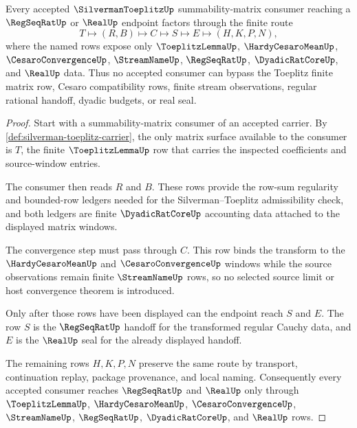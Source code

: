 \begin{theorem}\label{thm:silverman-toeplitz-regular-cauchy-handoff}
Every accepted $\SilvermanToeplitzUp$ summability-matrix consumer reaching a $\RegSeqRatUp$ or $\RealUp$ endpoint factors through the finite route
$$
T\longmapsto (R,B)\longmapsto C\longmapsto S\longmapsto E\longmapsto (H,K,P,N),
$$
where the named rows expose only $\ToeplitzLemmaUp$, $\HardyCesaroMeanUp$, $\CesaroConvergenceUp$, $\StreamNameUp$, $\RegSeqRatUp$, $\DyadicRatCoreUp$, and $\RealUp$ data. Thus no accepted consumer can bypass the Toeplitz finite matrix row, Cesaro compatibility rows, finite stream observations, regular rational handoff, dyadic budgets, or real seal.
\end{theorem}
\begin{proof}
Start with a summability-matrix consumer of an accepted carrier. By \autoref{def:silverman-toeplitz-carrier}, the only matrix surface available to the consumer is $T$, the finite $\ToeplitzLemmaUp$ row that carries the inspected coefficients and source-window entries.

The consumer then reads $R$ and $B$. These rows provide the row-sum regularity and bounded-row ledgers needed for the Silverman--Toeplitz admissibility check, and both ledgers are finite $\DyadicRatCoreUp$ accounting data attached to the displayed matrix windows.

The convergence step must pass through $C$. This row binds the transform to the $\HardyCesaroMeanUp$ and $\CesaroConvergenceUp$ windows while the source observations remain finite $\StreamNameUp$ rows, so no selected source limit or host convergence theorem is introduced.

Only after those rows have been displayed can the endpoint reach $S$ and $E$. The row $S$ is the $\RegSeqRatUp$ handoff for the transformed regular Cauchy data, and $E$ is the $\RealUp$ seal for the already displayed handoff.

The remaining rows $H,K,P,N$ preserve the same route by transport, continuation replay, package provenance, and local naming. Consequently every accepted consumer reaches $\RegSeqRatUp$ and $\RealUp$ only through $\ToeplitzLemmaUp$, $\HardyCesaroMeanUp$, $\CesaroConvergenceUp$, $\StreamNameUp$, $\RegSeqRatUp$, $\DyadicRatCoreUp$, and $\RealUp$ rows.
\end{proof}


